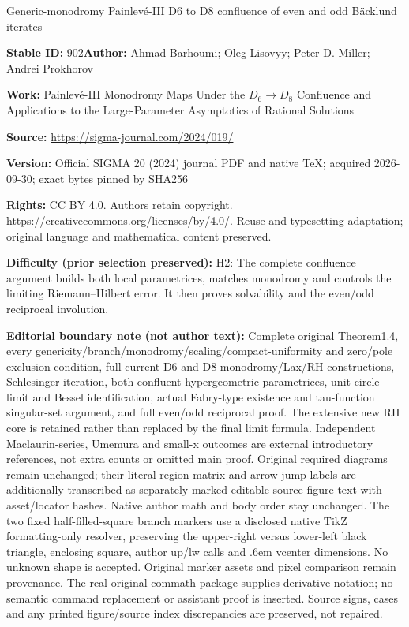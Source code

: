 \documentclass[11pt]{article}
\numberwithin{equation}{section}
\numberwithin{equation}{section}
\begin{document}
\begin{center}\Large Generic-monodromy Painlevé-III D6 to D8 confluence of even and odd Bäcklund iterates\end{center}
\noindent\textbf{Stable ID:} 902\quad\textbf{Author:} Ahmad Barhoumi; Oleg Lisovyy; Peter D. Miller; Andrei Prokhorov\par
\noindent\textbf{Work:} Painlev\'e-III Monodromy Maps Under the $D_6\to D_8$ Confluence and Applications to the Large-Parameter Asymptotics of Rational Solutions\par
\noindent\textbf{Source:} \url{https://sigma-journal.com/2024/019/}\par
\noindent\textbf{Version:} Official SIGMA 20 (2024) journal PDF and native TeX; acquired 2026-09-30; exact bytes pinned by SHA256\par
\noindent\textbf{Rights:} CC BY 4.0. Authors retain copyright. \url{https://creativecommons.org/licenses/by/4.0/}. Reuse and typesetting adaptation; original language and mathematical content preserved.\par
\noindent\textbf{Difficulty (prior selection preserved):} {\CJKfont H2: The complete confluence argument builds both local parametrices, matches monodromy and controls the limiting Riemann–Hilbert error. It then proves solvability and the even/odd reciprocal involution.}\par
\medskip\noindent\textbf{Editorial boundary note (not author text):} Complete original Theorem1.4, every genericity/branch/monodromy/scaling/compact-uniformity and zero/pole exclusion condition, full current D6 and D8 monodromy/Lax/RH constructions, Schlesinger iteration, both confluent-hypergeometric parametrices, unit-circle limit and Bessel identification, actual Fabry-type existence and tau-function singular-set argument, and full even/odd reciprocal proof. The extensive new RH core is retained rather than replaced by the final limit formula. Independent Maclaurin-series, Umemura and small-x outcomes are external introductory references, not extra counts or omitted main proof. Original required diagrams remain unchanged; their literal region-matrix and arrow-jump labels are additionally transcribed as separately marked editable source-figure text with asset/locator hashes. Native author math and body order stay unchanged. The two fixed half-filled-square branch markers use a disclosed native TikZ formatting-only resolver, preserving the upper-right versus lower-left black triangle, enclosing square, author up/lw calls and .6em vcenter dimensions. No unknown shape is accepted. Original marker assets and pixel comparison remain provenance. The real original commath package supplies derivative notation; no semantic command replacement or assistant proof is inserted. Source signs, cases and any printed figure/source index discrepancies are preserved, not repaired.\par
\end{document}
